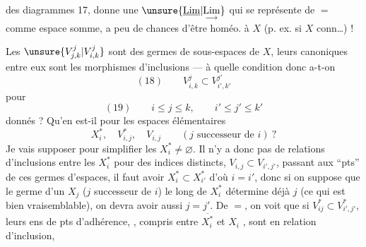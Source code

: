 des diagrammes 17, donne une $\unsure{\underline{\mathrm{Lim}}|\underset{\longrightarrow}{\mathrm{Lim}}}$ qui se représente de $=$ comme espace somme, a peu de chances d'être homéo. à $X$ (p. ex. si $X$ conn\ldots) !

Les $\unsure{V_{j,k}^j|V_{i,k}^j}$ sont des germes de sous-espaces de $X$, leurs    canoniques entre eux sont les morphismes d'inclusions — à quelle condition donc a-t-on
\[
(18)\qquad V_{i,k}^j\subset V_{i',k'}^{j'}
\]
pour
\[
(19)\qquad i\leq j\leq k,\qquad i'\leq j'\leq k'
\]
donnés ? Qu'en est-il pour les espaces élémentaires
\[
X_i^*,\quad V_{i,j}^*,\quad V_{i,j}\qquad(j\text{ successeur de }i)\ ?
\]
Je vais supposer pour simplifier les $X_i^*\ne\varnothing$.
Il n'y a donc pas de relations d'inclusions entre les $X_i^*$ pour des indices distincts,   $V_{i,j}\subset V_{i',j'}$, passant aux ``pts''  de ces germes d'espaces, il faut avoir $X_i^*\subset X_{i'}^*$ d'où $i=i'$, donc si on suppose que le germe d'un $X_j$ ($j$ successeur de $i$) le long de $X_i^*$ détermine déjà $j$ (ce qui est bien vraisemblable), on devra avoir aussi $j=j'$. De $=$, on voit que si $V_{ij}^*\subset V_{i',j'}^*$, leurs ens de pts d'adhérence, , compris entre $\overline{X_i^*}$ et $X_i$ , sont en relation d'inclusion,
